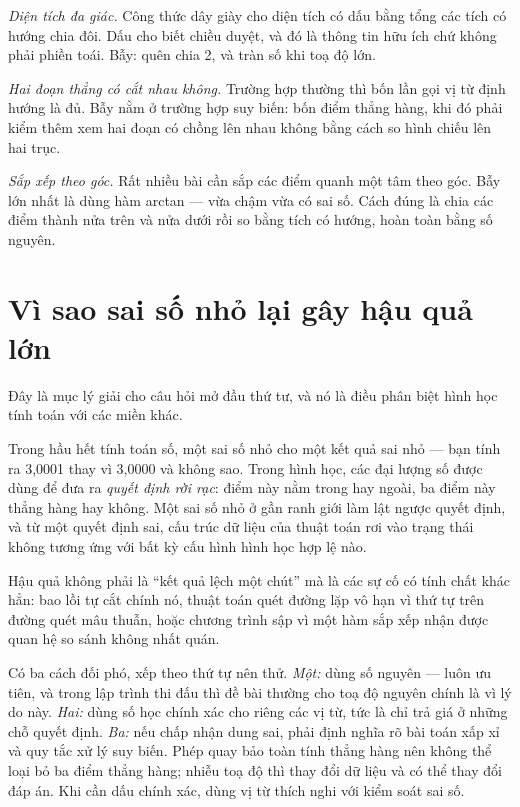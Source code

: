 \documentclass[../../algorithm.tex]{subfiles}
\begin{document}
\emph{Diện tích đa giác.} Công thức dây giày cho diện tích có dấu bằng tổng các tích có hướng chia đôi. Dấu cho biết chiều duyệt, và đó là thông tin hữu ích chứ không phải phiền toái. Bẫy: quên chia 2, và tràn số khi toạ độ lớn.

\emph{Hai đoạn thẳng có cắt nhau không.} Trường hợp thường thì bốn lần gọi vị từ định hướng là đủ. Bẫy nằm ở trường hợp suy biến: bốn điểm thẳng hàng, khi đó phải kiểm thêm xem hai đoạn có chồng lên nhau không bằng cách so hình chiếu lên hai trục.

\emph{Sắp xếp theo góc.} Rất nhiều bài cần sắp các điểm quanh một tâm theo góc. Bẫy lớn nhất là dùng hàm arctan --- vừa chậm vừa có sai số. Cách đúng là chia các điểm thành nửa trên và nửa dưới rồi so bằng tích có hướng, hoàn toàn bằng số nguyên.

\section{Vì sao sai số nhỏ lại gây hậu quả lớn}

Đây là mục lý giải cho câu hỏi mở đầu thứ tư, và nó là điều phân biệt hình học tính toán với các miền khác.

Trong hầu hết tính toán số, một sai số nhỏ cho một kết quả sai nhỏ --- bạn tính ra 3,0001 thay vì 3,0000 và không sao. Trong hình học, các đại lượng số được dùng để đưa ra \emph{quyết định rời rạc}: điểm này nằm trong hay ngoài, ba điểm này thẳng hàng hay không. Một sai số nhỏ ở gần ranh giới làm lật ngược quyết định, và từ một quyết định sai, cấu trúc dữ liệu của thuật toán rơi vào trạng thái không tương ứng với bất kỳ cấu hình hình học hợp lệ nào.

Hậu quả không phải là ``kết quả lệch một chút'' mà là các sự cố có tính chất khác hẳn: bao lồi tự cắt chính nó, thuật toán quét đường lặp vô hạn vì thứ tự trên đường quét mâu thuẫn, hoặc chương trình sập vì một hàm sắp xếp nhận được quan hệ so sánh không nhất quán.

Có ba cách đối phó, xếp theo thứ tự nên thử. \emph{Một:} dùng số nguyên --- luôn ưu tiên, và trong lập trình thi đấu thì đề bài thường cho toạ độ nguyên chính là vì lý do này. \emph{Hai:} dùng số học chính xác cho riêng các vị từ, tức là chỉ trả giá ở những chỗ quyết định. \emph{Ba:} nếu chấp nhận dung sai, phải định nghĩa rõ bài toán xấp xỉ và quy tắc xử lý suy biến. Phép quay bảo toàn tính thẳng hàng nên không thể loại bỏ ba điểm thẳng hàng; nhiễu toạ độ thì thay đổi dữ liệu và có thể thay đổi đáp án. Khi cần dấu chính xác, dùng vị từ thích nghi với kiểm soát sai số\cite{shewchuk1997}.
\end{document}

